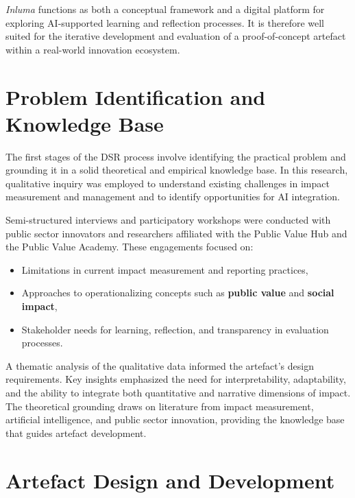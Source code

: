 \textit{Inluma} functions as both a conceptual framework and a digital platform for exploring AI-supported learning and reflection processes.
It is therefore well suited for the iterative development and evaluation of a proof-of-concept artefact within a real-world innovation ecosystem.


\section{Problem Identification and Knowledge Base}\label{sec:problem-identification}

The first stages of the DSR process involve identifying the practical problem and grounding it in a solid theoretical and empirical knowledge base.
In this research, qualitative inquiry was employed to understand existing challenges in impact measurement and management and to identify opportunities for AI integration.

Semi-structured interviews and participatory workshops were conducted with public sector innovators and researchers affiliated with the Public Value Hub and the Public Value Academy.
These engagements focused on:
\begin{itemize}
    \item Limitations in current impact measurement and reporting practices,
    \item Approaches to operationalizing concepts such as \textbf{public value} and \textbf{social impact},
    \item Stakeholder needs for learning, reflection, and transparency in evaluation processes.
\end{itemize}

A thematic analysis of the qualitative data informed the artefact’s design requirements.
Key insights emphasized the need for interpretability, adaptability, and the ability to integrate both quantitative and narrative dimensions of impact.
The theoretical grounding draws on literature from impact measurement, artificial intelligence, and public sector innovation, providing the knowledge base that guides artefact development.


\section{Artefact Design and Development}\label{sec:artefact-design}

